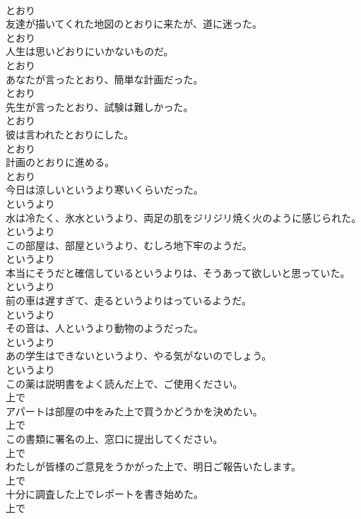 \documentclass[8pt]{extreport}
\begin{document}
\begin{CJK}{UTF8}{min}
\\	とおり
\\	友達が描いてくれた地図のとおりに来たが、道に迷った。	
\\	とおり
\\	人生は思いどおりにいかないものだ。	
\\	とおり
\\	あなたが言ったとおり、簡単な計画だった。	
\\	とおり
\\	先生が言ったとおり、試験は難しかった。	
\\	とおり
\\	彼は言われたとおりにした。	
\\	とおり
\\	計画のとおりに進める。	
\\	とおり
\\	今日は涼しいというより寒いくらいだった。	
\\	というより
\\	水は冷たく、氷水というより、両足の肌をジリジリ焼く火のように感じられた。	
\\	というより
\\	この部屋は、部屋というより、むしろ地下牢のようだ。	
\\	というより
\\	本当にそうだと確信しているというよりは、そうあって欲しいと思っていた。	
\\	というより
\\	前の車は遅すぎて、走るというよりはっているようだ。	
\\	というより
\\	その音は、人というより動物のようだった。	
\\	というより
\\	あの学生はできないというより、やる気がないのでしょう。	
\\	というより
\\	この薬は説明書をよく読んだ上で、ご使用ください。	
\\	上で
\\	アパートは部屋の中をみた上で買うかどうかを決めたい。	
\\	上で
\\	この書類に署名の上、窓口に提出してください。	
\\	上で
\\	わたしが皆様のご意見をうかがった上で、明日ご報告いたします。	
\\	上で
\\	十分に調査した上でレポートを書き始めた。	
\\	上で

\end{CJK}
\end{document}
